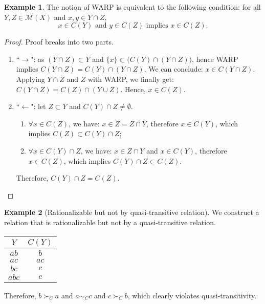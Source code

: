 \documentclass[12pt, a4paper]{article}
\theoremstyle{definition}
\newtheorem{example}{Example}
\begin{document}
\begin{example}
The notion of WARP is equivalent to the following condition: for all $Y,Z\in\mathcal{M}(X)$ and $x,y\in Y\cap Z$,
\[
x\in C(Y)\text{ and }y\in C(Z)\text{ implies }x\in C(Z).
\]
\begin{proof}
Proof breaks into two parts.
\begin{enumerate}[label = (\roman*)]
\item ``$\rightarrow$": as $(Y\cap Z)\subset Y$ and $\{x\}\subset \big(C(Y)\cap (Y\cap Z)\big)$, hence WARP implies $C(Y\cap Z) = C(Y)\cap (Y\cap Z)$. We can conclude: $x\in C(Y\cap Z)$. Applying $Y\cap Z$ and $Z$ with WARP, we finally get: $C(Y\cap Z)=C(Z)\cap (Y\cup Z)$. Hence, $x\in C(Z)$.
\item ``$\leftarrow$": let $Z\subset Y$ and $C(Y)\cap Z\neq \emptyset$. 
\begin{enumerate}
\item $\forall x\in C(Z)$, we have: $x\in Z=Z\cap Y$, therefore $x\in C(Y)$, which implies $C(Z)\subset C(Y)\cap Z$;
\item $\forall x\in C(Y)\cap Z$, we have: $x\in Z\cap Y$ and $x\in C(Y)$, therefore $x\in C(Z)$, which implies $C(Y)\cap Z \subset C(Z)$.
\end{enumerate}
Therefore, $C(Y)\cap Z = C(Z)$.
\end{enumerate}
\end{proof}
\end{example}

\begin{example}[Rationalizable but not by quasi-transitive relation]
We construct a relation that is rationalizable but not by a quasi-transitive relation.
\begin{center}
\begin{tabular}{c c}
$Y$ & $C(Y)$ \\
\hline
$ab$ & $b$ \\
$ac$ & $ac$ \\
$bc$ & $c$ \\
$abc$ & $c$ \\
\end{tabular}
\end{center}
Therefore, $b\succ_Ca$ and $a\sim_Cc$ and $c\succ_Cb$, which clearly violates quasi-transitivity. 
\end{example}
\end{document}
